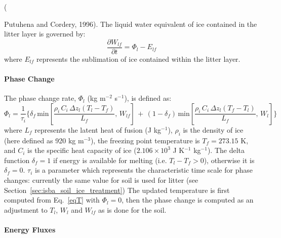 ({Putuhena and Cordery, 1996)\nocite{putuhena1996estimation}.
%
%
The liquid water equivalent of ice contained in the litter
layer is governed by:
%
\begin{equation}
 \label{ice}
 \frac{\partial W_{lf}}{\partial t} = \Phi_{l} - E_{lf}
\end{equation}
%
where $E_{lf}$ represents the sublimation of ice contained within the
litter layer.

\paragraph{Phase Change}

The phase change rate, $\Phi_l$ (kg m$^{-2}$ s$^{-1}$), 
is defined as:
%
\begin{equation}
 \label{ice2}
 \Phi_{l} = \frac{1}{\tau_{i}}
\Bigg\lbrace
\delta_f\,
{\mathrm{min}}\left[
\frac{\rho_i \, C_i\,  \Delta z_l  \left(T_l-T_f\right)}{L_f}, \,
W_{lf}\right] \,+\,
\left(1-\delta_f\right)\,
{\mathrm{min}}\left[
\frac{\rho_i \, C_i\,  \Delta z_l  \left(T_f-T_l\right)}{L_f}, \,
W_{l}\right] 
\Bigg\rbrace
\end{equation}
%
where $L_f$ represents the latent heat of
fusion (J kg$^{-1}$),  $\rho_i$ is the density of ice (here defined 
as 920 kg m$^{-3}$), the freezing point temperature is $T_f=273.15$ K,
and
$C_i$ is the specific heat capacity of ice ($2.106 \times 10^3$ J
K$^{-1}$ kg$^{-1}$).
The delta function $\delta_f=1$ if energy is available for melting
(i.e. $T_l-T_f>0$), otherwise it is $\delta_f=0$.
$\tau_{i}$ is a parameter which represents
the characteristic time scale for phase changes: currently
the same value for soil is used for litter  
(see Section~\ref{sec:isba_soil_ice_treatment})
The updated temperature is first computed from Eq.~\ref{eqT} with
$\Phi_l=0$, then the phase change is computed
as an adjustment to $T_l$, $W_{l}$ and $W_{lf}$ as is
done for the soil.

 
\paragraph{Energy Fluxes}

}
